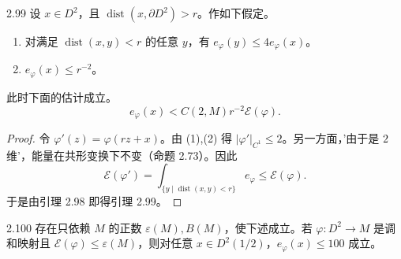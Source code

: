 \begin{lemma*}{2.99}
  设 $x\in D^2$，且 $\operatorname{dist}(x,\partial D^2)>r$。作如下假定。
  \begin{enumerate}[label=（\arabic*）,leftmargin=2.4em]
    \item 对满足 $\operatorname{dist}(x,y)<r$ 的任意 $y$，有 $e_\varphi(y)\le4e_\varphi(x)$。
    \item $e_\varphi(x)\le r^{-2}$。
  \end{enumerate}
  此时下面的估计成立。
  \begin{equation}
    e_\varphi(x)<C(2,M)r^{-2}\mathcal{E}(\varphi). \tag{2.32}
  \end{equation}
\end{lemma*}

\begin{proof}
  令 $\varphi'(z)=\varphi(rz+x)$。由 (1),(2) 得 $|\varphi'|_{C^1}\le2$。另一方面，'由于是 $2$ 维'，能量在共形变换下不变（命题 2.73）。因此
  \[
    \mathcal{E}(\varphi')=\int_{\{y\mid\operatorname{dist}(x,y)<r\}}e_\varphi\le\mathcal{E}(\varphi).
  \]
  于是由引理 2.98 即得引理 2.99。
\end{proof}

\begin{lemma*}{2.100}
  存在只依赖 $M$ 的正数 $\varepsilon(M),B(M)$，使下述成立。若 $\varphi\colon D^2\to M$ 是调和映射且 $\mathcal{E}(\varphi)\le\varepsilon(M)$，则对任意 $x\in D^2(1/2)$，$e_\varphi(x)\le100$ 成立。
\end{lemma*}

